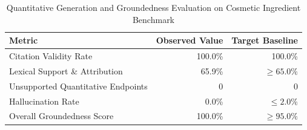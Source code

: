 \begin{table}[h]
\centering
\caption{Quantitative Generation and Groundedness Evaluation on Cosmetic Ingredient Benchmark}
\begin{tabular}{lrr}
\hline
\textbf{Metric} & \textbf{Observed Value} & \textbf{Target Baseline} \\
\hline
Citation Validity Rate & 100.0\% & 100.0\% \\
Lexical Support \& Attribution & 65.9\% & $\ge 65.0\%$ \\
Unsupported Quantitative Endpoints & 0 & 0 \\
Hallucination Rate & 0.0\% & $\le 2.0\%$ \\
Overall Groundedness Score & 100.0\% & $\ge 95.0\%$ \\
\hline
\end{tabular}
\label{tab:generation_groundedness}
\end{table}